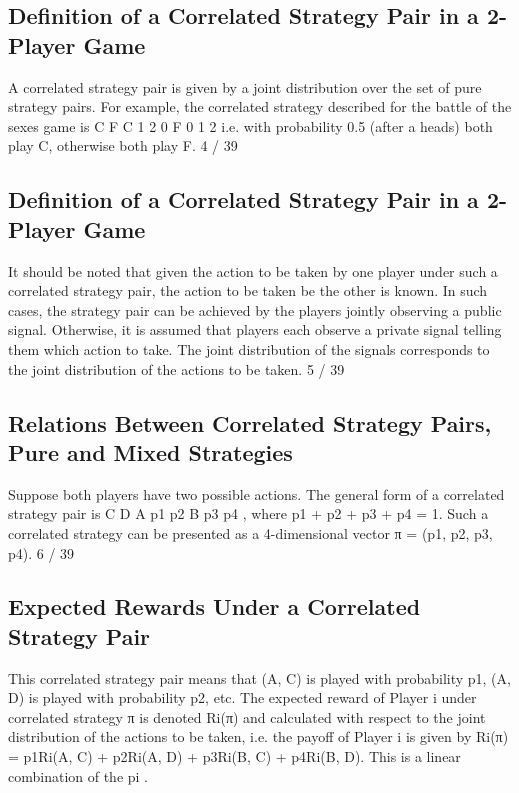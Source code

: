 \documentclass[]{report}
\begin{document}
\subsection{Definition of a Correlated Strategy Pair in a 2-Player Game}
A correlated strategy pair is given by a joint distribution over the
set of pure strategy pairs. For example, the correlated strategy
described for the battle of the sexes game is
C F
C
1
2
0
F 0
1
2
i.e. with probability 0.5 (after a heads) both play C, otherwise
both play F.
4 / 39

\subsection{Definition of a Correlated Strategy Pair in a 2-Player Game}
It should be noted that given the action to be taken by one player
under such a correlated strategy pair, the action to be taken be the
other is known. In such cases, the strategy pair can be achieved by
the players jointly observing a public signal.
Otherwise, it is assumed that players each observe a private signal
telling them which action to take. The joint distribution of the
signals corresponds to the joint distribution of the actions to be
taken.
5 / 39

\subsection{Relations Between Correlated Strategy Pairs, Pure and
Mixed Strategies}
Suppose both players have two possible actions. The general form
of a correlated strategy pair is
C D
A p1 p2
B p3 p4
, where p1 + p2 + p3 + p4 = 1. Such a correlated strategy can be
presented as a 4-dimensional vector π = (p1, p2, p3, p4).
6 / 39

\subsection{Expected Rewards Under a Correlated Strategy Pair}
This correlated strategy pair means that (A, C) is played with
probability p1, (A, D) is played with probability p2, etc.
The expected reward of Player i under correlated strategy π is
denoted Ri(π) and calculated with respect to the joint distribution
of the actions to be taken, i.e. the payoff of Player i is given by
Ri(π) = p1Ri(A, C) + p2Ri(A, D) + p3Ri(B, C) + p4Ri(B, D).
This is a linear combination of the pi
.
\end{document}
